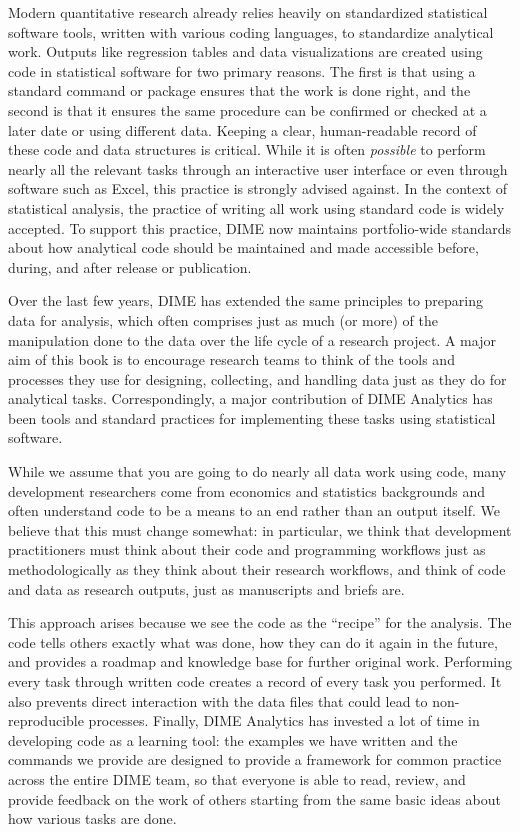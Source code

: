 Modern quantitative research already relies heavily
on standardized statistical software tools,
written with various coding languages, to standardize analytical work.
Outputs like regression tables and data visualizations
are created using code in statistical software for two primary reasons.
The first is that using a standard command or package ensures that the work is done right,
and the second is that it ensures the same procedure can be confirmed or checked
at a later date or using different data.
Keeping a clear, human-readable record of these code and data structures is critical.
While it is often \textit{possible} to perform nearly all the relevant tasks
through an interactive user interface or even through software such as Excel,
this practice is strongly advised against.
In the context of statistical analysis,
the practice of writing all work using standard code is widely accepted.
To support this practice, DIME now maintains portfolio-wide standards
about how analytical code should be maintained and made accessible
before, during, and after release or publication.

Over the last few years, DIME has extended the same principles to preparing data for analysis,
which often comprises just as much (or more) of the manipulation done to the data
over the life cycle of a research project.
A major aim of this book is to encourage research teams
to think of the tools and processes they use
for designing, collecting, and handling data
just as they do for analytical tasks.
Correspondingly, a major contribution of DIME Analytics
has been tools and standard practices
for implementing these tasks using statistical software.

While we assume that you are going to do nearly all data work using code,
many development researchers come from economics and statistics backgrounds
and often understand code to be a means to an end rather than an output itself.
We believe that this must change somewhat:
in particular, we think that development practitioners
must think about their code and programming workflows
just as methodologically as they think about their research workflows,
and think of code and data as research outputs, just as manuscripts and briefs are.

This approach arises because we see the code as the ``recipe'' for the analysis.
The code tells others exactly what was done,
how they can do it again in the future,
and provides a roadmap and knowledge base for further original work.\cite{hamermesh2007replication}
Performing every task through written code
creates a record of every task you performed.\cite{ozier2019replication}
It also prevents direct interaction
with the data files that could lead to non-reproducible processes.\cite{chang2015economics}
Finally, DIME Analytics has invested a lot of time in developing code as a learning tool:
the examples we have written and the commands we provide
are designed to provide a framework for common practice
across the entire DIME team, so that everyone is able to
read, review, and provide feedback on the work of others
starting from the same basic ideas about how various tasks are done.

